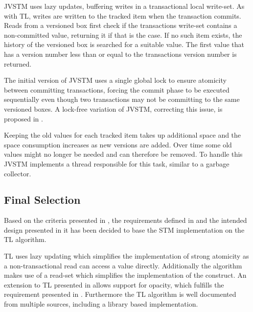 JVSTM uses lazy updates, buffering writes in a transactional local write-set\cite[p. 64]{cachopo2007development}. As with TL, writes are written to the tracked item when the transaction commits. Reads from a versioned box first check if the transactions write-set contains a non-committed value, returning it if that is the case\cite[p. 64]{cachopo2007development}. If no such item exists, the history of the versioned box is searched for a suitable value. The first value that has a version number less than or equal to the transactions version number is returned\cite[p. 64]{cachopo2007development}.

The initial version of JVSTM uses a single global lock to ensure atomicity between committing transactions\cite[p. 70]{cachopo2007development}, forcing the commit phase to be executed sequentially even though two transactions may not be committing to the same versioned boxes. A lock-free variation of JVSTM, correcting this issue, is proposed in \cite{fernandes2011lock}.

Keeping the old values for each tracked item takes up additional space and the space consumption increases as new versions are added. Over time some old values might no longer be needed and can therefore be removed. To handle this JVSTM implements a thread responsible for this task\cite[p. 70]{cachopo2007development}\cite[p. 88]{cachopo2007development}, similar to a garbage collector\cite[p. 472]{fischer2009crafting}.

\subsection{Final Selection}
Based on the criteria presented in , the requirements defined in  and the intended design presented in  it has been decided to base the \ac{STM} implementation on the TL algorithm. 

TL uses lazy updating which simplifies the implementation of strong atomicity as a non-transactional read can access a value directly. Additionally the algorithm makes use of a read-set which simplifies the implementation of the  construct. An extension to TL presented in \cite[p. 107]{harris2010transactional} allows support for opacity, which fulfills the requirement presented in . Furthermore the TL algorithm is well documented from multiple sources, including a library based implementation\cite{dice2006transactional}\cite[p. 438]{herlihy2012art}\cite[p. 106]{harris2010transactional}.

